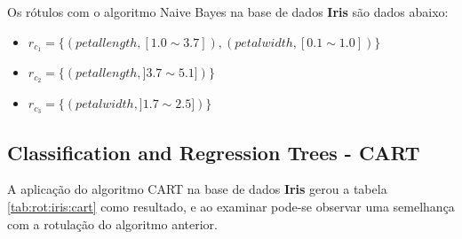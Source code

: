 \begin{table}[!h]
\centering
\caption{Matriz de Atributos Importantes do algoritmo Naive Bayes na base Iris}
\label{tab:execucoes:iris:cart}
\end{table}    


Os rótulos com o algoritmo Naive Bayes na base de dados \textbf{Iris} são dados abaixo:
\begin{itemize}[noitemsep]
 \item ${r_{c_1}=\{ (petallength, [ 1.0 \sim 3.7]), (petalwidth,[ 0.1 \sim 1.0 ] ) \} }$  
 \item ${r_{c_2}=\{ (petallength, ] 3.7 \sim 5.1]) \} }$
 \item ${r_{c_3}=\{ (petalwidth, ] 1.7 \sim 2.5 ]) \} }$
\end{itemize}

\subsection{Classification and Regression Trees - CART} \label{cap:resultados:ssec:iris:cart}

A aplicação do algoritmo CART na base de dados \textbf{Iris} gerou a tabela \ref{tab:rot:iris:cart} como resultado, e ao examinar pode-se observar uma semelhança com a rotulação do algoritmo anterior.

